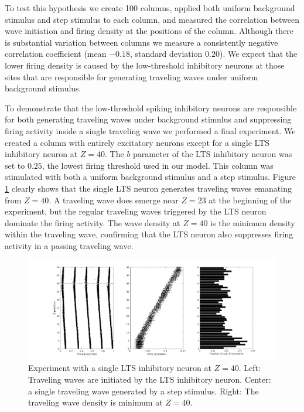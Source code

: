 \documentclass[a4paper,11pt]{article}
\begin{document}
To test this hypothesis we create 100 columns, applied both uniform background stimulus and step stimulus to each column, and measured the correlation between wave initiation and firing density at the positions of the column.
Although there is substantial variation between columns we measure a consistently negative correlation coefficient (mean $-0.18$, standard deviation $0.20$).
We expect that the lower firing density is caused by the low-threshold inhibitory neurons at those sites that are responsible for generating traveling waves under uniform background stimulus.

To demonstrate that the low-threshold spiking inhibitory neurons are responsible for both generating traveling waves under background stimulus and suppressing firing activity inside a single traveling wave we performed a final experiment.
We created a column with entirely excitatory neurons except for a single LTS inhibitory neuron at $Z=40$.
The $b$ parameter of the LTS inhibitory neuron was set to $0.25$, the lowest firing threshold used in our model.
This column was stimulated with both a uniform background stimulus and a step stimulus. 
Figure \ref{fig:lts_inhibit} clearly shows that the single LTS neuron generates traveling waves emanating from $Z=40$. 
A traveling wave does emerge near $Z=23$ at the beginning of the experiment, but the regular traveling waves triggered by the LTS neuron dominate the firing activity.
The wave density at $Z=40$ is the minimum density within the traveling wave, confirming that the LTS neuron also suppresses firing activity in a passing traveling wave.
\begin{figure}[!htb]
 \caption{Experiment with a single LTS inhibitory neuron at $Z=40$. Left: Traveling waves are initiated by the LTS inhibitory neuron. Center: a single traveling wave generated by a step stimulus. Right: The traveling wave density is minimum at $Z=40$.}
 \label{fig:lts_inhibit}
 \centering
   \includegraphics[width=\textwidth]{fig/SingleLTSInhibit}
\end{figure}
\end{document}
